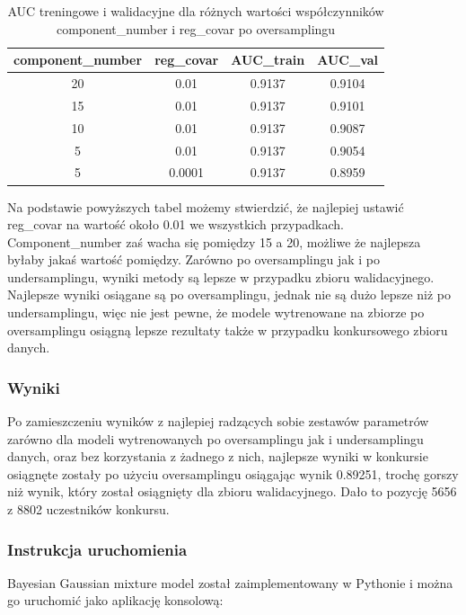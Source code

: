 \documentclass[12pt]{article}
\begin{document}
\begin{table}[h]
    \centering
    \begin{tabular}{|c|c|c|c|}
    \hline
        component\_number & reg\_covar & AUC\_train & AUC\_val \\ \hline
        20 & 0.01 & 0.9137 & 0.9104 \\ \hline 
        15 & 0.01 & 0.9137 & 0.9101 \\ \hline 
        10 & 0.01 & 0.9137 & 0.9087 \\ \hline 
        5 & 0.01 & 0.9137 & 0.9054 \\ \hline 
        5 & 0.0001 & 0.9137 & 0.8959 \\ \hline 
    \end{tabular}
    \caption{AUC treningowe i walidacyjne dla różnych wartości współczynników component\_number i reg\_covar po oversamplingu}
    \label{tab:gaussian_mix_gridsearch_oversampling}
\end{table}

Na podstawie powyższych tabel możemy stwierdzić, że najlepiej ustawić reg\_covar na wartość około 0.01 we wszystkich przypadkach. Component\_number zaś wacha się pomiędzy 15 a 20, możliwe że najlepsza byłaby jakaś wartość pomiędzy. Zarówno po oversamplingu jak i po undersamplingu, wyniki metody są lepsze w przypadku zbioru walidacyjnego. Najlepsze wyniki osiągane są po oversamplingu, jednak nie są dużo lepsze niż po undersamplingu, więc nie jest pewne, że modele wytrenowane na zbiorze po oversamplingu osiągną lepsze rezultaty także w przypadku konkursowego zbioru danych. 

\subsubsection{Wyniki}

Po zamieszczeniu wyników z najlepiej radzących sobie zestawów parametrów zarówno dla modeli wytrenowanych po oversamplingu jak i undersamplingu danych, oraz bez korzystania z żadnego z nich, najlepsze wyniki w konkursie osiągnęte zostały po użyciu oversamplingu osiągając wynik 0.89251, trochę gorszy niż wynik, który został osiągnięty dla zbioru walidacyjnego. Dało to pozycję 5656 z 8802 uczestników konkursu.

\subsubsection{Instrukcja uruchomienia}

Bayesian Gaussian mixture model został zaimplementowany w Pythonie i można go uruchomić jako aplikację konsolową:
\end{document}
